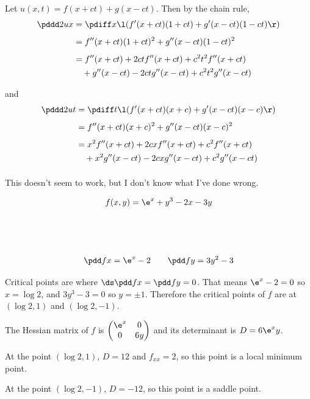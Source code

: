 \documentclass[a4paper]{article}
\begin{document}
Let $u(x, t) = f(x+ct) + g(x-ct)$. Then by the chain rule, \begin{align*}
\pddd 2ux &= \pdiff x \l( f'(x+ct) (1+ct) + g'(x-ct) (1-ct) \r)\\[1ex]
&= f''(x+ct) (1+ct)^2 + g''(x-ct) (1-ct)^2\\[1ex]
&= f''(x+ct) + 2ct f''(x+ct) + c^2 t^2 f''(x+ct)\\
&\quad + g''(x-ct) - 2ct g''(x-ct) + c^2 t^2 g''(x-ct)\\[1ex]
\end{align*}
and \begin{align*}
\pddd 2ut &= \pdiff t \l( f'(x+ct) (x+c) + g'(x-ct) (x-c) \r)\\[1ex]
&= f''(x+ct) (x+c)^2 + g''(x-ct) (x-c)^2\\[1ex]
&= x^2 f''(x+ct) + 2cx f''(x+ct) + c^2 f''(x+ct)\\
&\quad + x^2 g''(x-ct) - 2cx g''(x-ct) + c^2 g''(x-ct)\\[1ex]
\end{align*}

This doesn't seem to work, but I don't know what I've done wrong.


$$f(x, y) = \e^x + y^3 - 2x - 3y$$

\subsection{~}

$$\pdd fx = \e^x - 2 \qquad \pdd fy = 3y^2 - 3$$

Critical points are where $\ds \pdd fx = \pdd fy = 0$. That means $\e^x - 2 = 0$ so $x = \log 2$, and $3y^3 - 3 = 0$ so $y = \pm 1$. Therefore the critical points of $f$ are at $(\log 2, 1)$ and $(\log 2, -1)$.

The Hessian matrix of $f$ is $\begin{pmatrix} \e^x & 0\\ 0 & 6y \end{pmatrix}$ and its determinant is $D = 6 \e^x y$.

At the point $(\log 2, 1)$, $D = 12$ and $f_{xx} = 2$, so this point is a local minimum point.

At the point $(\log 2, -1)$, $D = -12$, so this point is a saddle point.

\subsection{~}
\end{document}
